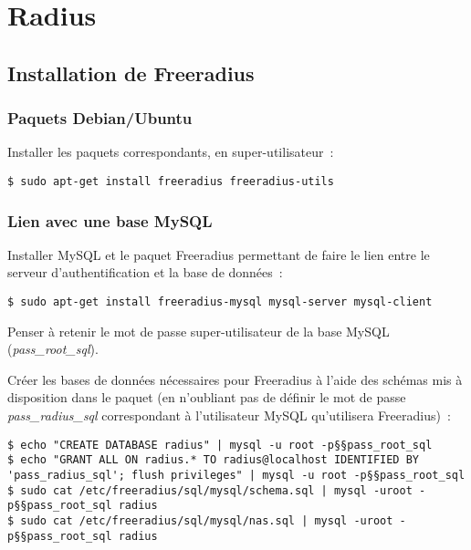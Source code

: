\section{Radius}
\subsection{Installation de Freeradius}
\subsubsection{Paquets Debian/Ubuntu}

Installer les paquets correspondants, en super-utilisateur~:

\begin{lstlisting}
$ sudo apt-get install freeradius freeradius-utils
\end{lstlisting}

\subsubsection{Lien avec une base MySQL}

Installer MySQL et le paquet Freeradius permettant de faire le lien entre le serveur d'authentification et la base de données~:

\begin{lstlisting}
$ sudo apt-get install freeradius-mysql mysql-server mysql-client
\end{lstlisting}

Penser à retenir le mot de passe super-utilisateur de la base MySQL (\emph{pass\_root\_sql}).

Créer les bases de données nécessaires pour Freeradius à l'aide des schémas mis à disposition dans le paquet (en n'oubliant pas de définir le mot de passe \emph{pass\_radius\_sql} correspondant à l'utilisateur MySQL qu'utilisera Freeradius)~:

\begin{lstlisting}
$ echo "CREATE DATABASE radius" | mysql -u root -p§§pass_root_sql
$ echo "GRANT ALL ON radius.* TO radius@localhost IDENTIFIED BY 'pass_radius_sql'; flush privileges" | mysql -u root -p§§pass_root_sql
$ sudo cat /etc/freeradius/sql/mysql/schema.sql | mysql -uroot -p§§pass_root_sql radius
$ sudo cat /etc/freeradius/sql/mysql/nas.sql | mysql -uroot -p§§pass_root_sql radius
\end{lstlisting}

